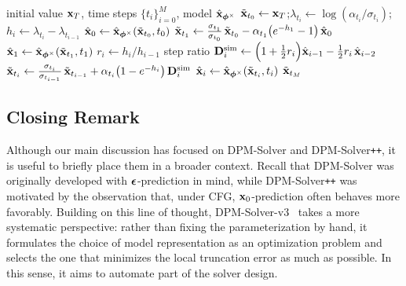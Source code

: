 \begin{algorithm}[H]
    \centering
    \caption{DPM-Solver\texttt{++}(2M).}
    \label{alg:dpmpp-2m}
    \begin{algorithmic}[1]
    \Require initial value ${\mathbf{x}}_T$, time steps $\{t_i\}_{i=0}^M$, model $\hat{{\mathbf{x}}}_{{\bm{\phi}}^\times}$
    \State $\tilde{{\mathbf{x}}}_{t_0}\gets{\mathbf{x}}_T$;\quad $\lambda_{t_i}\gets \log(\alpha_{t_i}/\sigma_{t_i})$;\quad $h_i\gets \lambda_{t_i}-\lambda_{t_{i-1}}$
    \State $\hat{{\mathbf{x}}}_0 \gets \hat{{\mathbf{x}}}_{{\bm{\phi}}^\times}(\tilde{{\mathbf{x}}}_{t_0},t_0)$ 
    \Statex \noindent {}
    \State $\tilde{{\mathbf{x}}}_{t_1} \gets \tfrac{\sigma_{t_1}}{\sigma_{t_0}}\,\tilde{{\mathbf{x}}}_{t_0}
             - \alpha_{t_1}\big(e^{-h_1}-1\big)\,\hat{{\mathbf{x}}}_0$
    \State $\hat{{\mathbf{x}}}_1 \gets \hat{{\mathbf{x}}}_{{\bm{\phi}}^\times}(\tilde{{\mathbf{x}}}_{t_1},t_1)$ 
    \Statex {}
        \State $r_i \gets h_i/h_{i-1}$ \Comment step ratio
        \State ${\mathbf{D}}_i^{\mathrm{sim}} \gets \Big(1+\tfrac12 r_i\Big)\hat{{\mathbf{x}}}_{i-1} - \tfrac12 r_i\,\hat{{\mathbf{x}}}_{i-2}$
        \State $\tilde{{\mathbf{x}}}_{t_i} \gets \tfrac{\sigma_{t_i}}{\sigma_{t_{i-1}}}\,\tilde{{\mathbf{x}}}_{t_{i-1}}
               + \alpha_{t_i}\big(1-e^{-h_i}\big)\,{\mathbf{D}}_i^{\mathrm{sim}}$
        \State $\hat{{\mathbf{x}}}_i \gets \hat{{\mathbf{x}}}_{{\bm{\phi}}^\times}(\tilde{{\mathbf{x}}}_{t_i},t_i)$ 
    \EndFor
    \State \Return $\tilde{{\mathbf{x}}}_{t_M}$
    \end{algorithmic}
\end{algorithm}

\subsection{Closing Remark}
Although our main discussion has focused on DPM-Solver and DPM-Solver\texttt{++}, it is useful to briefly place them in a broader context. Recall that DPM-Solver was originally developed with ${\bm{\epsilon}}$-prediction in mind, while DPM-Solver\texttt{++} was motivated by the observation that, under CFG, ${\mathbf{x}}_0$-prediction often behaves more favorably. Building on this line of thought, DPM-Solver-v3~\citep{zheng2023dpm} takes a more systematic perspective: rather than fixing the parameterization by hand, it formulates the choice of model representation as an optimization problem and selects the one that minimizes the local truncation error as much as possible. In this sense, it aims to automate part of the solver design. 

